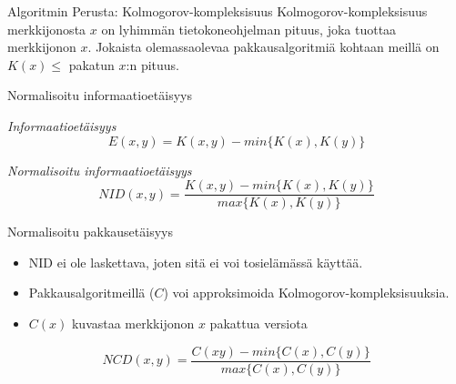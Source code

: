 \documentclass{beamer}
\begin{document}
\begin{frame}{Algoritmin Perusta: Kolmogorov-kompleksisuus}
  Kolmogorov-kompleksisuus merkkijonosta $x$ on lyhimmän tietokoneohjelman pituus, joka tuottaa merkkijonon $x$.
   Jokaista olemassaolevaa pakkausalgoritmiä kohtaan meillä on $K(x) \leq$ pakatun $x$:n pituus.
\end{frame}

\begin{frame}{Normalisoitu informaatioetäisyys}

   \emph{Informaatioetäisyys}
    \[
    E(x, y) = K(x, y) - min\{K(x), K(y)\}
  \]

  \emph{Normalisoitu informaatioetäisyys}
    \[
      NID(x,y) =  \frac{K(x, y) - min\{K(x), K(y)\}}{max\{K(x), K(y)\}}
    \]
\end{frame}

\begin{frame}{Normalisoitu pakkausetäisyys}
\begin{itemize}
  \item NID ei ole laskettava, joten sitä ei voi tosielämässä käyttää.
  \item Pakkausalgoritmeillä ($C$) voi approksimoida Kolmogorov-kompleksisuuksia.
  \item $C(x)$ kuvastaa merkkijonon $x$ pakattua versiota
\end{itemize}
    \[
    NCD(x,y) =  \frac{C(xy) - min\{C(x), C(y)\}}{max\{C(x), C(y)\}}
    \]
\end{frame}

\end{document}
